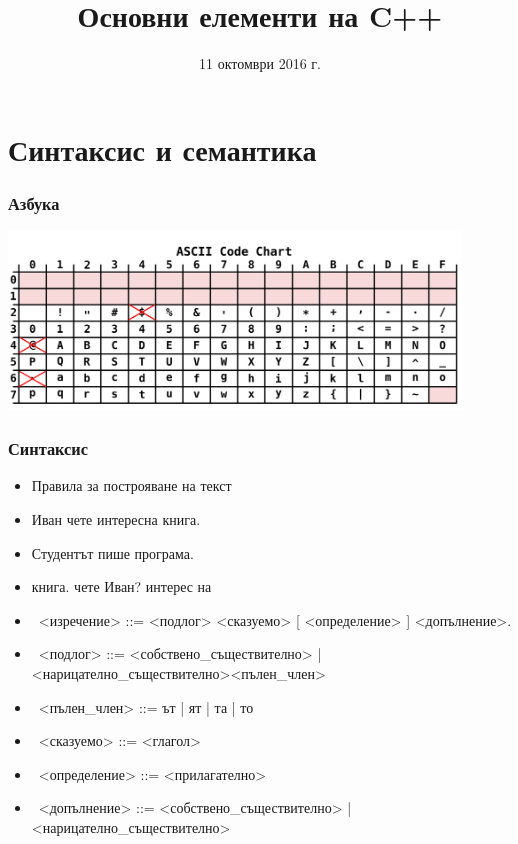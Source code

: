 \documentclass{beamer}
\title{Основни елементи на C++}
\date{11 октомври 2016 г.}
\begin{document}
\begin{frame}
  \titlepage
\end{frame}

\section{Синтаксис и семантика}

\begin{frame}
  \frametitle{Азбука}
  \begin{center}
    \includegraphics[width=0.9\textwidth]{images/ascii.pdf}\\[2em]
  \end{center}
  \wiki
\end{frame}

\begin{frame}
  \frametitle{Синтаксис}
  \begin{itemize}[<+->]
  \item Правила за построяване на текст
  \item \alert{Иван чете интересна книга.}
  \item \alert{Студентът пише програма.}
  \item \alert{книга. чете Иван? интерес на}
  \item\ <изречение> ::= <подлог> <сказуемо> [ <определение> ] <допълнение>\alert.
  \item\ <подлог> ::= <собствено\_съществително> | <нарицателно\_съществително><пълен\_член>
  \item\ <пълен\_член> ::= \alert{ът} | \alert{ят} | \alert{та} | \alert{то}
  \item\ <сказуемо> ::= <глагол>
  \item\ <определение> ::= <прилагателно>
  \item\ <допълнение> ::= <собствено\_съществително> | <нарицателно\_съществително>
  \end{itemize}
\end{frame}
\end{document}
